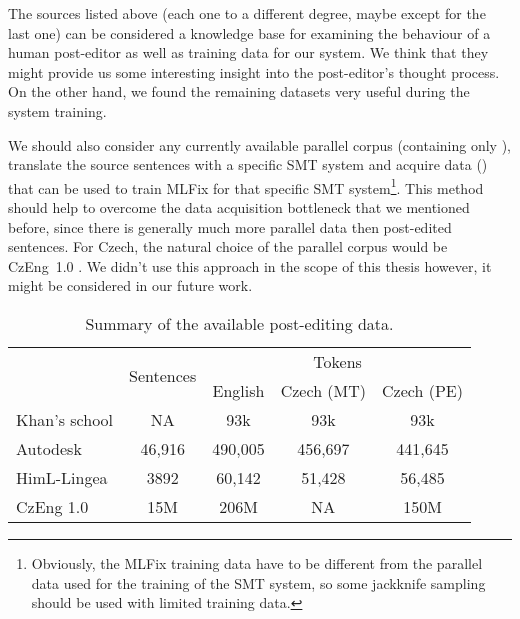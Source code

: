 The sources listed above (each one to a different degree, maybe except for the last one) can
be considered a knowledge base for examining the behaviour of a human post-editor as well
as training data for our system. We think that they might provide us
some interesting insight into the post-editor's thought process.
On the other hand, we found the remaining datasets very useful during the system training.

We should also consider any currently available parallel corpus (containing only
), translate
the source sentences with a specific SMT system and acquire data
() that can be used to train MLFix for that
specific SMT system\footnote{Obviously, the MLFix training data have to be
different from the parallel data used for the training of the SMT system, so
some
jackknife sampling should be used with limited training data.}. This method
should help to overcome the data acquisition bottleneck that we mentioned before,
 since there is generally much more
parallel data then post-edited sentences.
For Czech, the natural choice of the parallel corpus would be
CzEng~1.0 \cite{czeng10:lrec2012}.
We didn't use this approach in the scope of this thesis however, it might
be considered in our future work.


\begin{table*}[t]
\centering
\small

\begin{tabular}{lcccc}
\multirow{2}{*}{}  &  \multirow{2}{*}{\hash{} Sentences}  &  \multicolumn{3}{c}{\hash{} Tokens}  \\
&   & English & Czech (MT) & Czech (PE) \\
\hline
Khan's school & NA & \tilda{}93k & \tilda{}93k & \tilda{}93k \\
Autodesk & 46,916 & 490,005 & 456,697 & 441,645 \\
HimL-Lingea & 3892 & 60,142 & 51,428 & 56,485 \\
CzEng 1.0 & 15M & 206M & NA & 150M \\
\end{tabular}
\caption{Summary of the available post-editing data.
}
\label{avail-data}
\end{table*}

